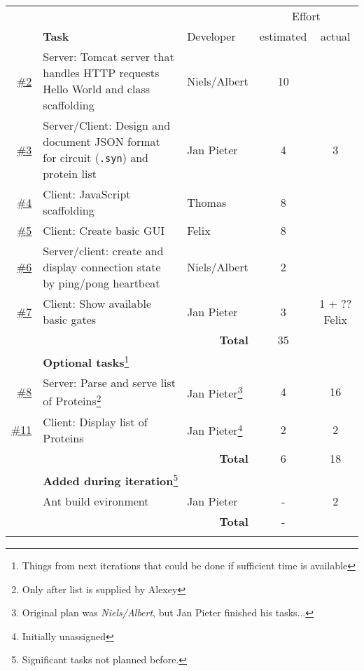 \documentclass[a4paper]{article}
\newcommand{\githubissue}[1]{\href{https://github.com/FelixAkk/synthbio/issues/#1}{\##1}}
\newcommand{\thickhline}{\noalign{\hrule height 0.8pt}}
\begin{document}
\setlength{\extrarowheight}{3pt}
{\centering\begin{tabularx}{\textwidth}{r p{8cm} | l | cc}
\multicolumn{3}{c}{}& \multicolumn{2}{c}{Effort} \\	
& \textbf{Task} & Developer & estimated & actual \\
\hline
\githubissue{2} &
Server: Tomcat server that handles HTTP requests {\sc Hello World} and class scaffolding &
Niels/Albert & 10 & \\

\githubissue{3} &
Server/Client: Design and document JSON format for circuit (\verb|.syn|) and protein list &
Jan Pieter & 4 & 3\\

\githubissue{4} &
Client: JavaScript scaffolding &
Thomas & 8 & \\
 
\githubissue{5} &
Client: Create basic GUI &
Felix & 8 & \\
 
\githubissue{6} &
Server/client: create and display connection state by ping/pong heartbeat &
Niels/Albert & 2 & \\
 
\githubissue{7} &
Client: Show available basic gates &
Jan Pieter & 3 & 1 + ??Felix \\ \hline

\multicolumn{3}{r}{\textbf{Total}  }
 & 35 & \\[6mm]
 
 & \multicolumn{2}{l}{\textbf{Optional tasks}\footnote{Things from next iterations that could be done if sufficient time is available}} \\ \hline

\githubissue{8} &
Server: Parse and serve list of Proteins\footnote{Only after list is supplied by Alexey} &
Jan Pieter\footnote{Original plan was \textit{Niels/Albert}, but Jan Pieter finished his tasks...}  & 4 & 16\\

\githubissue{11} &
Client: Display list of Proteins &
Jan Pieter\footnote{Initially unassigned} & 2 & 2 \\
\hline
\multicolumn{3}{r}{\textbf{Total}  }
 & 6 & 18\\[6mm]

& \multicolumn{2}{l}{\textbf{Added during iteration}\footnote{Significant tasks not planned before.}} \\ \hline{}
& Ant build evironment &
 Jan Pieter & - & 2 \\ 

\hline
\multicolumn{3}{r}{\textbf{Total}  }
 & - &
\\[6mm] \thickhline

\multicolumn{3}{r}{\textbf{Grand Total}  }
 & \\
\end{tabularx}
}
\end{document}
